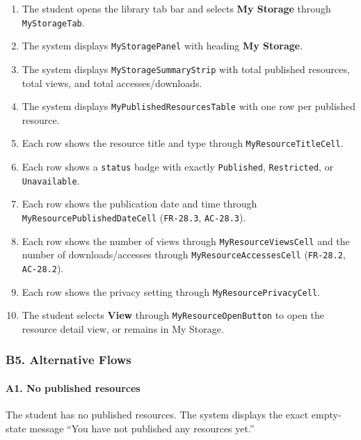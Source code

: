 \documentclass[12pt]{article}
\begin{document}
\begin{enumerate}
\item The student opens the library tab bar and selects \textbf{My Storage} through \texttt{MyStorageTab}.
\item The system displays \texttt{MyStoragePanel} with heading \textbf{My Storage}.
\item The system displays \texttt{MyStorageSummaryStrip} with total published resources, total views, and total accesses/downloads.
\item The system displays \texttt{MyPublishedResourcesTable} with one row per published resource.
\item Each row shows the resource title and type through \texttt{MyResourceTitleCell}.
\item Each row shows a \texttt{status} badge with exactly \texttt{Published}, \texttt{Restricted}, or \texttt{Unavailable}.
\item Each row shows the publication date and time through \texttt{MyResourcePublishedDateCell} (\texttt{FR-28.3}, \texttt{AC-28.3}).
\item Each row shows the number of views through \texttt{MyResourceViewsCell} and the number of downloads/accesses through \texttt{MyResourceAccessesCell} (\texttt{FR-28.2}, \texttt{AC-28.2}).
\item Each row shows the privacy setting through \texttt{MyResourcePrivacyCell}.
\item The student selects \textbf{View} through \texttt{MyResourceOpenButton} to open the resource detail view, or remains in My Storage.
\end{enumerate}
\par\medskip

\hypertarget{sec:b5-alternative-flows}{}
\subsubsection*{B5. Alternative Flows}
\par\medskip

\hypertarget{sec:a1-no-published-resources}{}
\paragraph*{A1. No published resources}
\par\medskip

The student has no published resources. The system displays the exact empty-state message “You have not published any resources yet.”
\par\medskip
\end{document}
